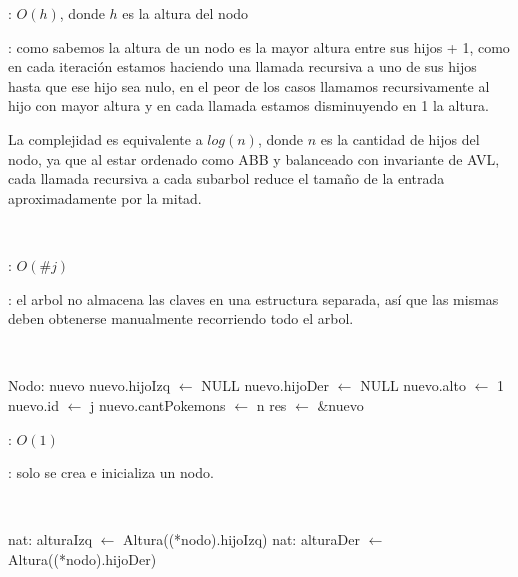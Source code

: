 \begin{Algoritmos}
	\complejidad: $O(h)$, donde $h$ es la altura del nodo

	\justifcomp: como sabemos la altura de un nodo es la mayor altura entre sus hijos + 1, como en cada iteración estamos haciendo una llamada recursiva a uno de sus hijos hasta que ese hijo sea nulo, en el peor de los casos llamamos recursivamente al hijo con mayor altura y en cada llamada estamos disminuyendo en 1 la altura.

	La complejidad es equivalente a $log(n)$, donde $n$ es la cantidad de hijos del nodo, ya que al estar ordenado como ABB y balanceado con invariante de AVL, cada llamada recursiva a cada subarbol reduce el tamaño de la entrada aproximadamente por la mitad.

	~

	\begin{algorithm}[H]
		\NoCaptionOfAlgo
		\caption{}
		\BlankLine
	\end{algorithm}
	
	\complejidad: $O(\#j)$

	\justifcomp: el arbol no almacena las claves en una estructura separada, así que las mismas deben obtenerse manualmente recorriendo todo el arbol.

	~

	\begin{algorithm}[H]
		\NoCaptionOfAlgo
		\caption{}
		\BlankLine
		Nodo: nuevo
		nuevo.hijoIzq $\leftarrow$ NULL
		nuevo.hijoDer $\leftarrow$ NULL
		nuevo.alto $\leftarrow$ 1
		nuevo.id $\leftarrow$ j
		nuevo.cantPokemons $\leftarrow$ n
		res $\leftarrow$ \&nuevo
	\end{algorithm}
	
	\complejidad: $O(1)$

	\justifcomp: solo se crea e inicializa un nodo.

	~

	\begin{algorithm}[H]
		\NoCaptionOfAlgo
		\caption{}
		\BlankLine
		nat: alturaIzq $\leftarrow$ Altura((*nodo).hijoIzq)
		nat: alturaDer $\leftarrow$ Altura((*nodo).hijoDer)
	\end{algorithm}
	

\end{Algoritmos}
